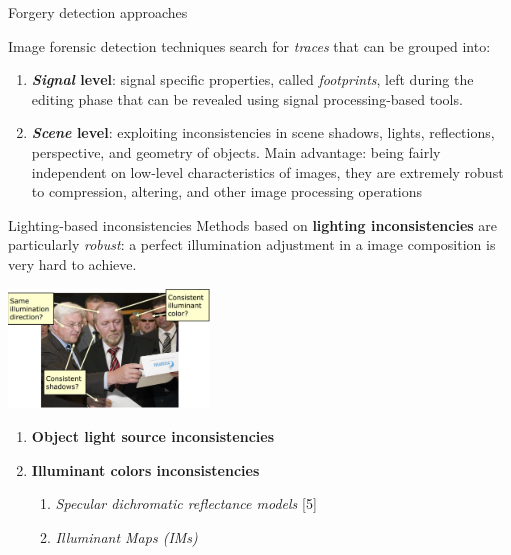 \begin{tframe}{Forgery detection approaches}

\vspace{0.2cm}
Image forensic detection techniques search for \textit{traces} that can be grouped into:
\vspace{0.3cm}
\begin{enumerate}
\item \textbf{\textit{Signal} level}: signal specific properties, called \emph{footprints}, left during the editing phase that can be revealed using signal processing-based tools.
\vspace{0.3cm}
\item \textbf{\textit{Scene} level}: exploiting inconsistencies in scene shadows, lights, reflections, perspective, and geometry of objects. Main advantage: being fairly independent on low-level characteristics of images, they are extremely robust to compression, altering, and other image processing operations
\end{enumerate}
\vspace{0.3cm}
%
\end{tframe}


\begin{tframe}{Lighting-based inconsistencies}
Methods based on \textbf{lighting inconsistencies} are particularly \emph{robust}: a perfect illumination adjustment in a image composition is very hard to achieve.
\begin{center}
\includegraphics[width=0.4\textwidth]{images/lighting-based.jpg}
\end{center}
\begin{enumerate}
\item \textbf{Object light source inconsistencies}
\vspace{0.1cm}
\item \textbf{Illuminant colors inconsistencies}
\vspace{0.1cm}
\begin{enumerate}
\item \textit{Specular dichromatic reflectance models} [5]
\vspace{0.1cm}
\item \textit{Illuminant Maps (IMs)}
\end{enumerate}
\end{enumerate}
\vspace{0.3cm}
\end{tframe}


